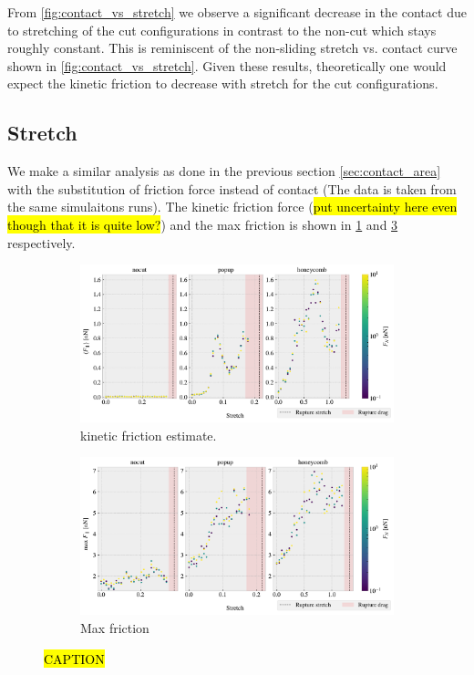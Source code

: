 From \cref{fig:contact_vs_stretch} we observe a significant decrease in the contact due to stretching of the cut configurations in contrast to the non-cut which stays roughly constant. This is reminiscent of the non-sliding stretch vs. contact curve shown in \cref{fig:contact_vs_stretch}. Given these results, theoretically one would expect the kinetic friction to decrease with stretch for the cut configurations.


\subsection{Stretch} 

We make a similar analysis as done in the previous section \cref{sec:contact_area} with the substitution of friction force instead of contact (The data is taken from the same simulaitons runs). The kinetic friction force (\hl{put uncertainty here even though that it is quite low?}) and the max friction is shown in \cref{fig:multi_stretch_mean_fric} and \cref{fig:multi_stretch_max_fric} respectively.



\begin{figure}[H]
  \centering
  \begin{subfigure}[t]{\textwidth}
      \centering
      \includegraphics[width=\textwidth]{figures/baseline/multi_stretch_mean_compare.pdf}
      \caption{kinetic friction estimate. }
      \label{fig:multi_stretch_mean_fric}
  \end{subfigure}
  \hfill
  \begin{subfigure}[t]{\textwidth}
      \centering
      \includegraphics[width=\textwidth]{figures/baseline/multi_stretch_max_compare.pdf}
      \caption{Max friction}
      \label{fig:multi_stretch_max_fric}
  \end{subfigure}
  \hfill
     \caption{\hl{CAPTION}}
     \label{fig:multi_stretch_max_fric}
\end{figure}


